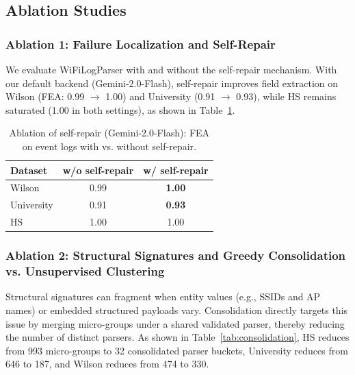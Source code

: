 \documentclass[journal]{IEEEtran}
\begin{document}
\subsection{Ablation Studies}
\label{subsec:ablation}

\subsubsection{Ablation 1: Failure Localization and Self-Repair}
We evaluate WiFiLogParser with and without the self-repair mechanism. With our default backend (Gemini-2.0-Flash), self-repair improves field extraction on Wilson (FEA: 0.99 $\rightarrow$ 1.00) and University (0.91 $\rightarrow$ 0.93), while HS remains saturated (1.00 in both settings), as shown in Table~\ref{tab:ablation_repair}.

\begin{table}[!t]
	\centering
	\caption{Ablation of self-repair (Gemini-2.0-Flash): FEA on event logs with vs. without self-repair.}
	\label{tab:ablation_repair}
	\begin{tabular}{lcc}
		\toprule
		\textbf{Dataset} & \textbf{w/o self-repair} & \textbf{w/ self-repair} \\
		\midrule
		Wilson           & 0.99                     & \textbf{1.00}           \\
		University       & 0.91                     & \textbf{0.93}           \\
		HS               & 1.00                     & 1.00                    \\
		\bottomrule
	\end{tabular}
\end{table}

\subsubsection{Ablation 2: Structural Signatures and Greedy Consolidation vs. Unsupervised Clustering}


Structural signatures can fragment when entity values (e.g., SSIDs and AP names) or embedded structured payloads vary. Consolidation directly targets this issue by merging micro-groups under a shared validated parser, thereby reducing the number of distinct parsers. As shown in Table~\ref{tab:consolidation}, HS reduces from 993 micro-groups to 32 consolidated parser buckets, University reduces from 646 to 187, and Wilson reduces from 474 to 330.
\end{document}

